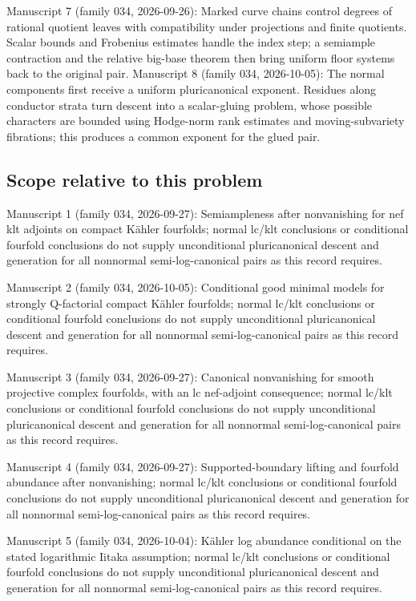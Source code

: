 \documentclass[11pt]{article}
\begin{document}
Manuscript 7 (family 034, 2026-09-26): Marked curve chains control degrees of rational quotient leaves with compatibility under projections and finite quotients. Scalar bounds and Frobenius estimates handle the index step; a semiample contraction and the relative big-base theorem then bring uniform floor systems back to the original pair. Manuscript 8 (family 034, 2026-10-05): The normal components first receive a uniform pluricanonical exponent. Residues along conductor strata turn descent into a scalar-gluing problem, whose possible characters are bounded using Hodge-norm rank estimates and moving-subvariety fibrations; this produces a common exponent for the glued pair.

\subsection{Scope relative to this problem}
Manuscript 1 (family 034, 2026-09-27): Semiampleness after nonvanishing for nef klt adjoints on compact Kähler fourfolds; normal lc/klt conclusions or conditional fourfold conclusions do not supply unconditional pluricanonical descent and generation for all nonnormal semi-log-canonical pairs as this record requires.

Manuscript 2 (family 034, 2026-10-05): Conditional good minimal models for strongly Q-factorial compact Kähler fourfolds; normal lc/klt conclusions or conditional fourfold conclusions do not supply unconditional pluricanonical descent and generation for all nonnormal semi-log-canonical pairs as this record requires.

Manuscript 3 (family 034, 2026-09-27): Canonical nonvanishing for smooth projective complex fourfolds, with an lc nef-adjoint consequence; normal lc/klt conclusions or conditional fourfold conclusions do not supply unconditional pluricanonical descent and generation for all nonnormal semi-log-canonical pairs as this record requires.

Manuscript 4 (family 034, 2026-09-27): Supported-boundary lifting and fourfold abundance after nonvanishing; normal lc/klt conclusions or conditional fourfold conclusions do not supply unconditional pluricanonical descent and generation for all nonnormal semi-log-canonical pairs as this record requires.

Manuscript 5 (family 034, 2026-10-04): Kähler log abundance conditional on the stated logarithmic Iitaka assumption; normal lc/klt conclusions or conditional fourfold conclusions do not supply unconditional pluricanonical descent and generation for all nonnormal semi-log-canonical pairs as this record requires.
\end{document}

